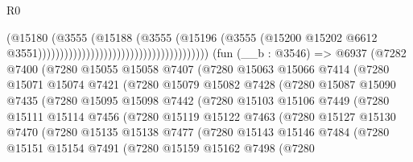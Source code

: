 \begin{lexlean}{R0}
\begin{coremodule}
                                                                    (@15180
                                                                      (@3555
                                                                        (@15188
                                                                          (@3555
                                                                            (@15196
                                                                              (@3555
                                                                                (@15200
                                                                                  @15202
                                                                                  @6612
                                                                                  @3551)))))))))))))))))))))))))))))))))))))))
    (fun (__b : @3546) =>
    @6937
      (@7282
        @7400
        (@7280
          @15055
          @15058
          @7407
          (@7280
            @15063
            @15066
            @7414
            (@7280
              @15071
              @15074
              @7421
              (@7280
                @15079
                @15082
                @7428
                (@7280
                  @15087
                  @15090
                  @7435
                  (@7280
                    @15095
                    @15098
                    @7442
                    (@7280
                      @15103
                      @15106
                      @7449
                      (@7280
                        @15111
                        @15114
                        @7456
                        (@7280
                          @15119
                          @15122
                          @7463
                          (@7280
                            @15127
                            @15130
                            @7470
                            (@7280
                              @15135
                              @15138
                              @7477
                              (@7280
                                @15143
                                @15146
                                @7484
                                (@7280
                                  @15151
                                  @15154
                                  @7491
                                  (@7280
                                    @15159
                                    @15162
                                    @7498
                                    (@7280

\end{coremodule}
\end{lexlean}
